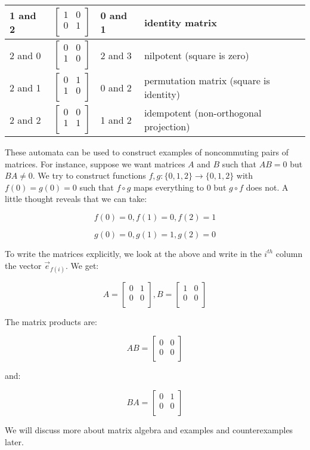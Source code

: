 \documentclass[10pt]{amsart}
\begin{document}
\begin{tabular}{|l|l|l|l|}
  1 and 2 & $\left[ \begin{matrix} 1 & 0 \\ 0 & 1 \\\end{matrix}\right]$ & 0 and 1 & identity matrix\\\hline
  2 and 0 & $\left[ \begin{matrix} 0 & 0 \\ 1 & 0 \\\end{matrix}\right]$ & 2 and 3 & nilpotent (square is zero)\\\hline
  2 and 1 & $\left[ \begin{matrix} 0 & 1 \\ 1 & 0 \\\end{matrix}\right]$ & 0 and 2 & permutation matrix (square is identity)\\\hline
  2 and 2 & $\left[ \begin{matrix} 0 & 0 \\ 1 & 1 \\\end{matrix}\right]$ & 1 and 2 & idempotent (non-orthogonal projection)\\\hline
\end{tabular}

\vspace{0.2in}

These automata can be used to construct examples of noncommuting pairs
of matrices. For instance, suppose we want matrices $A$ and $B$ such
that $AB = 0$ but $BA \ne 0$. We try to construct functions $f,g: \{
0,1,2 \} \to \{ 0,1,2 \}$ with $f(0) = g(0) = 0$ such that $f \circ g$
maps everything to $0$ but $g \circ f$ does not. A little thought
reveals that we can take:

$$f(0) = 0, f(1) = 0, f(2) = 1$$

$$g(0) = 0, g(1) = 1,g(2) = 0$$

To write the matrices explicitly, we look at the above and write in
the $i^{th}$ column the vector $\vec{e}_{f(i)}$. We get:

$$A = \left[\begin{matrix} 0 & 1 \\ 0 & 0 \\\end{matrix}\right], B = \left[\begin{matrix} 1 & 0 \\ 0 & 0 \\\end{matrix}\right]$$

The matrix products are:

$$AB = \left[\begin{matrix} 0 & 0 \\ 0 & 0 \\\end{matrix}\right]$$

and:

$$BA = \left[\begin{matrix} 0 & 1 \\ 0 & 0 \\\end{matrix}\right]$$

We will discuss more about matrix algebra and examples and
counterexamples later.
\end{document}
